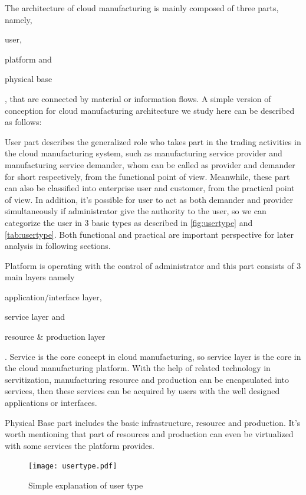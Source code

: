 The architecture of cloud manufacturing is mainly composed of three parts, namely, \begin{inparaenum}[1)]
\item user,
\item platform and
\item physical base
\end{inparaenum}, that are connected by material or information flows. A simple version of conception for cloud manufacturing architecture we study here can be described as follows:
\begin{compactdesc}
\item [User] part describes the generalized role who takes part in the trading activities in the cloud manufacturing system, such as manufacturing service provider and manufacturing service demander, whom can be called as provider and demander for short respectively, from the functional point of view. Meanwhile, these part can also be classified into enterprise user and customer, from the practical point of view. In addition, it's possible for user to act as both demander and provider simultaneously if administrator give the authority to the user, so we can categorize the user in 3 basic types as described in \autoref{fig:usertype} and \autoref{tab:usertype}. Both functional and practical are important perspective for later analysis in following sections.
\item [Platform] is operating with the control of administrator and this part consists of 3 main layers namely
	\begin{inparaenum}[1)]
	\item application/interface layer,
	\item service layer and
	\item resource \& production layer
	\end{inparaenum}.
Service is the core concept in cloud manufacturing, so service layer is the core in the cloud manufacturing platform. With the help of related technology in servitization, manufacturing resource and production can be encapsulated into services, then these services can be acquired by users with the well designed applications or interfaces.
\item [Physical Base] part includes the basic infrastructure, resource and production. It's worth mentioning that part of resources and production can even be virtualized with some services the platform provides.
\end{compactdesc}


\begin{figure}[htbp]
	\centering
	\texttt{[image: usertype.pdf]}
	\caption{Simple explanation of user type}
	\label{fig:usertype}
\end{figure}


